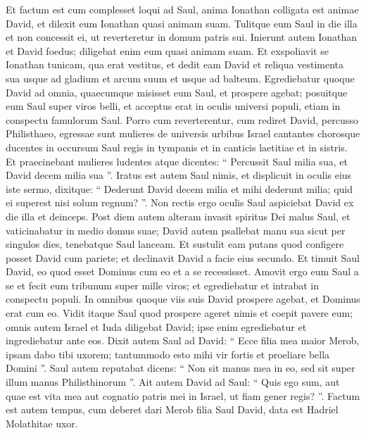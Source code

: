 \begin{biblechapter}
\begin{biblechapter}
\begin{biblechapter}
\begin{biblechapter}
\begin{biblechapter}
\begin{biblechapter}
\begin{biblechapter}
\begin{biblechapter}
\begin{biblechapter}
\begin{biblechapter}
\begin{biblechapter}
\begin{biblechapter}
\begin{biblechapter}
\begin{biblechapter}
\begin{biblechapter}
\begin{biblechapter}
\begin{biblechapter}
\begin{biblechapter}
\verse Et factum est cum complesset loqui ad Saul, anima Ionathan colligata est animae David, et dilexit eum Ionathan quasi animam suam. 
\verse Tulitque eum Saul in die illa et non concessit ei, ut reverteretur in domum patris sui. 
\verse Inierunt autem Ionathan et David foedus; diligebat enim eum quasi animam suam. 
 \verse Et exspoliavit se Ionathan tunicam, qua erat vestitus, et dedit eam David et reliqua vestimenta sua usque ad gladium et arcum suum et usque ad balteum. 
\verse Egrediebatur quoque David ad omnia, quaecumque misisset eum Saul, et prospere agebat; posuitque eum Saul super viros belli, et acceptus erat in oculis universi populi, etiam in conspectu famulorum Saul.
 \verse Porro cum reverterentur, cum rediret David, percusso Philisthaeo, egressae sunt mulieres de universis urbibus Israel cantantes chorosque ducentes in occursum Saul regis in tympanis et in canticis laetitiae et in sistris. 
\verse Et praecinebant mulieres ludentes atque dicentes:
 “ Percussit Saul milia sua,
 et David decem milia sua ”.
 \verse Iratus est autem Saul nimis, et displicuit in oculis eius iste sermo, dixitque: “ Dederunt David decem milia et mihi dederunt milia; quid ei superest nisi solum regnum? ”. 
\verse Non rectis ergo oculis Saul aspiciebat David ex die illa et deinceps.
 \verse Post diem autem alteram invasit spiritus Dei malus Saul, et vaticinabatur in medio domus suae; David autem psallebat manu sua sicut per singulos dies, tenebatque Saul lanceam. 
\verse Et sustulit eam putans quod configere posset David cum pariete; et declinavit David a facie eius secundo.
 \verse Et timuit Saul David, eo quod esset Dominus cum eo et a se recessisset. 
 \verse Amovit ergo eum Saul a se et fecit eum tribunum super mille viros; et egrediebatur et intrabat in conspectu populi. 
\verse In omnibus quoque viis suis David prospere agebat, et Dominus erat cum eo. 
\verse Vidit itaque Saul quod prospere ageret nimis et coepit pavere eum; 
\verse omnis autem Israel et Iuda diligebat David; ipse enim egrediebatur et ingrediebatur ante eos.
 \verse Dixit autem Saul ad David: “ Ecce filia mea maior Merob, ipsam dabo tibi uxorem; tantummodo esto mihi vir fortis et proeliare bella Domini ”. Saul autem reputabat dicens: “ Non sit manus mea in eo, sed sit super illum manus Philisthinorum ”. 
\verse Ait autem David ad Saul: “ Quis ego sum, aut quae est vita mea aut cognatio patris mei in Israel, ut fiam gener regis? ”. 
\verse Factum est autem tempus, cum deberet dari Merob filia Saul David, data est Hadriel Molathitae uxor.

\end{biblechapter}
\end{biblechapter}
\end{biblechapter}
\end{biblechapter}
\end{biblechapter}
\end{biblechapter}
\end{biblechapter}
\end{biblechapter}
\end{biblechapter}
\end{biblechapter}
\end{biblechapter}
\end{biblechapter}
\end{biblechapter}
\end{biblechapter}
\end{biblechapter}
\end{biblechapter}
\end{biblechapter}
\end{biblechapter}
